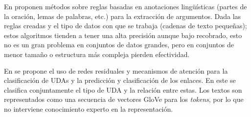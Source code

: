 \documentclass[a4paper,11pt,twocolumn,twoside]{article}
\begin{document}
En \cite{dykes2020reconstructing} proponen métodos sobre reglas basadas en anotaciones lingüísticas (partes de la oración, lemas de palabras, etc.) 
para la extracción de argumentos. Dada las reglas creadas y el tipo
de datos con que se trabaja (cadenas de texto pequeñas); estos algoritmos tienden a tener una alta precisión aunque 
bajo recobrado, esto no es un gran problema en conjuntos de datos grandes, pero en conjuntos de menor tamaño o estructura 
más compleja pierden efectividad.



En \cite{galassi2021deep} se propone el uso de redes residuales y mecanismos de atención
para la clasificación de UDAs y la predicción y clasificación de los enlaces. En este
se clasifica conjuntamente el tipo de UDA y la relación entre estas. Los textos son 
representados como una secuencia de vectores GloVe para los \textit{tokens}, por lo que 
no interviene conocimiento experto en la representación.


\end{document}

